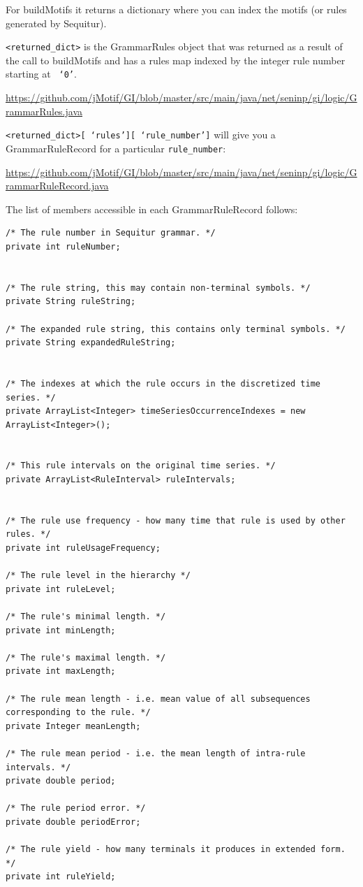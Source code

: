 \documentclass[letterpaper, 12pt]{article}
\def\bsq#1{%
	\lq{#1}\rq}
\begin{document}
For buildMotifs it returns a dictionary where you can index the motifs (or rules generated by Sequitur).

\texttt{<returned\_dict>} is the GrammarRules object that was returned as a result of the call to buildMotifs and has a rules map indexed by the integer rule number starting at \texttt{\bsq{0}}.

\small{\url{https://github.com/jMotif/GI/blob/master/src/main/java/net/seninp/gi/logic/GrammarRules.java}}

\texttt{<returned\_dict>[\bsq{rules}][\bsq{rule\_number}]} will give you a GrammarRuleRecord for a particular \texttt{rule\_number}:

\small{\url{https://github.com/jMotif/GI/blob/master/src/main/java/net/seninp/gi/logic/GrammarRuleRecord.java}}

The list of members accessible in each GrammarRuleRecord follows:

\begin{lstlisting}
/* The rule number in Sequitur grammar. */
private int ruleNumber;


/* The rule string, this may contain non-terminal symbols. */
private String ruleString;

/* The expanded rule string, this contains only terminal symbols. */
private String expandedRuleString;


/* The indexes at which the rule occurs in the discretized time series. */
private ArrayList<Integer> timeSeriesOccurrenceIndexes = new ArrayList<Integer>();


/* This rule intervals on the original time series. */
private ArrayList<RuleInterval> ruleIntervals;


/* The rule use frequency - how many time that rule is used by other rules. */
private int ruleUsageFrequency;

/* The rule level in the hierarchy */
private int ruleLevel;

/* The rule's minimal length. */
private int minLength;

/* The rule's maximal length. */
private int maxLength;

/* The rule mean length - i.e. mean value of all subsequences corresponding to the rule. */
private Integer meanLength;

/* The rule mean period - i.e. the mean length of intra-rule intervals. */
private double period;

/* The rule period error. */
private double periodError;

/* The rule yield - how many terminals it produces in extended form. */
private int ruleYield;
\end{lstlisting}
\end{document}
